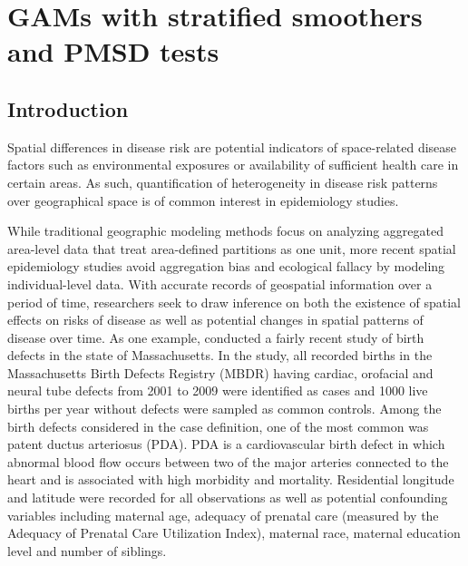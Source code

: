 \chapter{GAMs with stratified smoothers and PMSD tests}



	
	\section{Introduction}
	
	Spatial differences in disease risk are potential indicators of space-related disease factors such as environmental exposures or availability of sufficient health care in certain areas. As such, quantification of heterogeneity in disease risk patterns over geographical space is of common interest in epidemiology studies. 
	
	While traditional geographic modeling methods focus on analyzing aggregated area-level data that treat area-defined partitions as one unit, more recent spatial epidemiology studies avoid aggregation bias and ecological fallacy by modeling individual-level data.  With accurate records of geospatial information over a  period of time, researchers seek to draw inference on both the existence of spatial effects on risks of disease as well as potential changes in spatial patterns of disease over time. As one example, \cite{girguis2016maternal} conducted a fairly recent study of birth defects in the state of Massachusetts.  In the study, all recorded births in the Massachusetts Birth Defects Registry (MBDR) having cardiac, orofacial and neural tube defects from 2001 to 2009 were identified as cases and 1000 live births per year without defects were sampled as common controls. Among the birth defects considered in the case definition, one of the most common was patent ductus arteriosus (PDA).  PDA is a cardiovascular birth defect in which abnormal blood flow occurs between two of the major arteries connected to the heart and is associated with high morbidity and mortality. Residential longitude and latitude were recorded for all observations as well as potential confounding variables including maternal age, adequacy of prenatal care (measured by the Adequacy of Prenatal Care Utilization Index), maternal race, maternal education level and number of siblings. 
	

